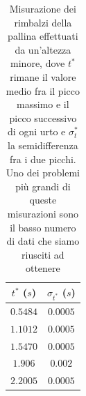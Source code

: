 \documentclass{article}
\begin{document}
\begin{table}
	\centering
	\begin{tabular}{c c}
		\toprule
		$t^*$ ($s$) & $\sigma_{t^*}$ ($s$) \\ \midrule
		$0.5484$ & $0.0005$ \\ \midrule
		$1.1012$ & $0.0005$ \\ \midrule
		$1.5470$ & $0.0005$ \\ \midrule
		$1.906$ & $0.002$ \\ \midrule
		$2.2005$ & $0.0005$ \\ \bottomrule
	\end{tabular}
	\caption{Misurazione dei rimbalzi della pallina effettuati da un'altezza minore, dove $t^*$ rimane il valore medio fra il picco massimo e il picco successivo di ogni urto e $\sigma_t^*$ la semidifferenza fra i due picchi. Uno dei problemi più grandi di queste misurazioni sono il basso numero di dati che siamo riusciti ad ottenere}
\end{table}
\end{document}
